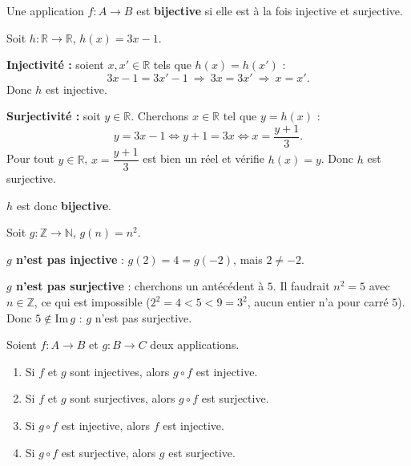 \documentclass[a4paper,12pt,openany]{book}
\begin{document}
\begin{definition}[3.7 -- Bijectivité]
Une application $f : A \to B$ est \textbf{bijective} si elle est à la fois
injective et surjective.
\end{definition}

\begin{exemple}[3.4]
Soit $h : \mathbb{R} \to \mathbb{R}$, $h(x)=3x-1$.

\textbf{Injectivité :} soient $x,x' \in \mathbb{R}$ tels que $h(x)=h(x')$ :
\[
3x-1=3x'-1 \ \Longrightarrow\ 3x=3x' \ \Longrightarrow\ x=x'.
\]
Donc $h$ est injective.

\textbf{Surjectivité :} soit $y\in\mathbb{R}$. Cherchons $x\in\mathbb{R}$ tel
que $y=h(x)$ :
\[
y=3x-1 \iff y+1=3x \iff x=\frac{y+1}{3}.
\]
Pour tout $y\in\mathbb{R}$, $x=\dfrac{y+1}{3}$ est bien un réel et vérifie
$h(x)=y$. Donc $h$ est surjective.

$h$ est donc \textbf{bijective}.
\end{exemple}

\begin{exemple}[3.5]
Soit $g : \mathbb{Z} \to \mathbb{N}$, $g(n)=n^2$.

\textbf{$g$ n'est pas injective} : $g(2)=4=g(-2)$, mais $2\neq -2$.

\textbf{$g$ n'est pas surjective} : cherchons un antécédent à $5$. Il
faudrait $n^2=5$ avec $n\in\mathbb{Z}$, ce qui est impossible ($2^2=4<5<9=3^2$,
aucun entier n'a pour carré $5$). Donc $5 \notin \mathrm{Im}\,g$ : $g$ n'est
pas surjective.
\end{exemple}

\begin{proposition}
Soient $f : A \to B$ et $g : B \to C$ deux applications.
\begin{enumerate}
  \item Si $f$ et $g$ sont injectives, alors $g\circ f$ est injective.
  \item Si $f$ et $g$ sont surjectives, alors $g\circ f$ est surjective.
  \item Si $g\circ f$ est injective, alors $f$ est injective.
  \item Si $g\circ f$ est surjective, alors $g$ est surjective.
\end{enumerate}
\end{proposition}
\end{document}
